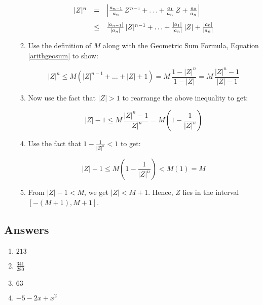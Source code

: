 \begin{enumerate}
\begin{enumerate}
\[\begin{array}{rcl} 

 |Z|^{n} & = &  \left| \frac{a_{n-\mbox{\tiny$1$}}}{a_{n}} \, Z^{n-\mbox{\tiny$1$}} + \ldots + \frac{a_{\mbox{\tiny$1$}}}{a_{n}} \,  Z + \frac{a_{\mbox{\tiny$0$}}}{a_{n}} \right|  \\[10pt]
 
 & \leq &  \frac{|a_{n-1}|}{|a_{n}|} \, |Z|^{n-1} + \ldots + \frac{|a_{1}|}{|a_{n}|} \, |Z| + \frac{|a_{0}|}{|a_{n}|} \\ \end{array} \]

\item  Use the definition of  $M$  along with the Geometric Sum Formula, Equation \ref{arithgeosum} to show:

\[ |Z|^{n} \leq M \left( |Z|^{n-1} + \ldots + |Z| + 1\right) = M \, \dfrac{1 - |Z|^n}{1 - |Z|} =  M \,  \dfrac{ |Z|^n - 1}{|Z| - 1} \]

\item  Now use the fact that $|Z| > 1$ to rearrange the above inequality to get:

\[ |Z| - 1 \leq M \, \dfrac{|Z|^{n} - 1}{|Z|^n} = M \left( 1 - \frac{1}{|Z|^n} \right) \]

\item  Use the fact that $1 - \frac{1}{|Z|^n} < 1$ to get:  

\[ |Z| - 1 \leq  M \left( 1 - \frac{1}{|Z|^n} \right)  < M (1) = M\]

\item  From $|Z| - 1 < M$, we get $|Z| < M+1$.  Hence, $Z$ lies in the interval  $\left[-(M+1), M+1\right]$.

\end{enumerate}



\end{enumerate}
\newpage

\subsection{Answers}

\begin{multicols}{4} 
\begin{enumerate}

\item $213$
\item $\frac{341}{280}$
\item $63$
\item $-5 - 2x + x^{2}$

\setcounter{HW}{\value{enumi}}
\end{enumerate}
\end{multicols}

